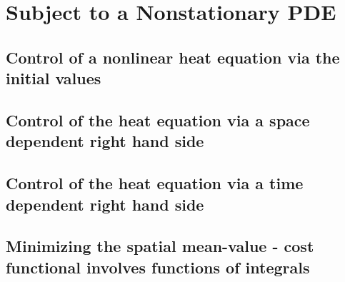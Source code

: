 \documentclass[a4paper,cleardoubleempty]{scrreprt}
\theoremstyle{plain}
\theoremstyle{remark}
\begin{document}
\section{Subject to a Nonstationary PDE}
\label{OPT_Instat}
\subsection{Control of a nonlinear heat equation via the initial values}
\label{OPT_Instat initial-value end-time}

\clearpage
\subsection{Control of the heat equation via a space dependent right hand side}
\label{OPT_Instat stationary control}

\clearpage
\subsection{Control of the heat equation via a time dependent right hand side}
\label{OPT_Instat nonstationary control}

\clearpage
\subsection{Minimizing the spatial mean-value - cost functional involves functions of integrals}
\label{OPT_Instat initial-value extension}

\clearpage










\printindex

\end{document}
